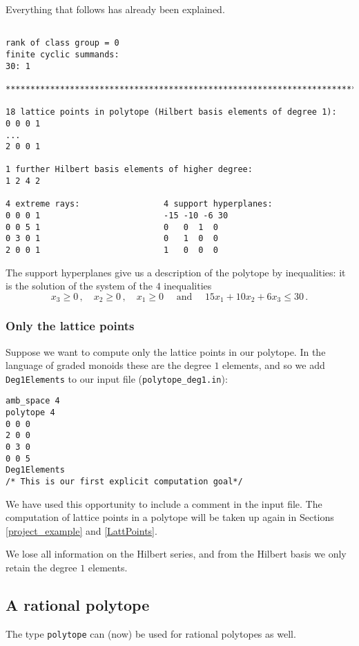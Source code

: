 \documentclass[12pt,a4paper]{scrartcl}
\theoremstyle{definition}
\begin{document}
Everything that follows has already been explained.
\begin{Verbatim}

rank of class group = 0
finite cyclic summands:
30: 1  

***********************************************************************

18 lattice points in polytope (Hilbert basis elements of degree 1):
0 0 0 1
...
2 0 0 1

1 further Hilbert basis elements of higher degree:
1 2 4 2

4 extreme rays:                 4 support hyperplanes:
0 0 0 1                         -15 -10 -6 30
0 0 5 1                         0   0  1  0
0 3 0 1                         0   1  0  0
2 0 0 1                         1   0  0  0
\end{Verbatim}

The support hyperplanes give us a description of the polytope
by inequalities: it is the solution of the system of the $4$
inequalities
$$ x_3\ge0\,,\quad
x_2\ge0\,,\quad x_1\ge0\quad\text{ and }\quad
15x_1+10x_2+6x_3\le30\,.
$$

\subsubsection{Only the lattice points}\label{only_lattpoints}

Suppose we want to compute only the lattice points in our polytope. In the language of graded monoids these are the degree $1$ elements, and so we add \verb|Deg1Elements| to our input file (\verb|polytope_deg1.in|):
\begin{Verbatim}
amb_space 4
polytope 4
0 0 0
2 0 0
0 3 0
0 0 5
Deg1Elements
/* This is our first explicit computation goal*/
\end{Verbatim}
We have used this opportunity to include a comment in the input file. The computation of lattice points in a polytope will be taken up again in Sections \ref{project_example} and \ref{LattPoints}.

We lose all information on the Hilbert series, and from the Hilbert basis we only retain the degree $1$ elements.

\subsection{A rational polytope}\label{rational}

The type \verb|polytope| can (now) be used for rational polytopes as well.
\begin{center}
\end{center}
\end{document}
